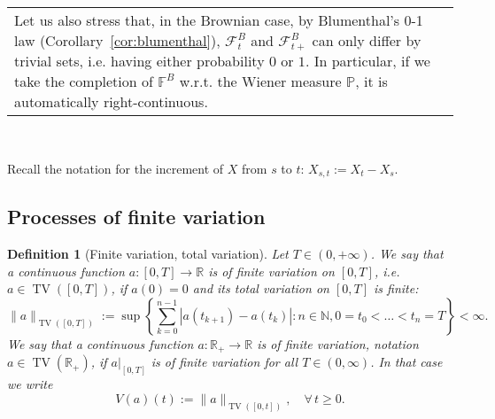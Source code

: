 \documentclass{article}
\newcommand{\coloneq}{:=}
\newcommand{\tmdummy}{$\mbox{}$}
\newcommand{\emph}[1]{{\em #1\/}}
\newtheorem{definition}{Definition}
{\theorembodyfont{\rmfamily}\newtheorem{example}{Example}}
\newcommand{\1}{\1}
\begin{document}
{\begin{tabularx}{1.0\textwidth}{@{}X@{}}
  Let us also stress that, in the Brownian case, by Blumenthal's 0-1 law
  (Corollary~\ref{cor:blumenthal}), $\mathcal{F}^B_t$ and $\mathcal{F}^B_{t
  +}$ can only differ by trivial sets, i.e. having either probability $0$ or
  $1$. In particular, if we take the completion of $\mathbb{F}^B$ w.r.t. the
  Wiener measure $\mathbb{P}$, it is automatically right-continuous. 
\end{tabularx}

\

Recall the notation for the increment of $X$ from $s$ to $t$: $X_{s, t}
\coloneq X_t - X_s$.

\subsection{Processes of finite variation}

\begin{definition}[Finite variation, total variation]
  Let $T \in (0, + \infty)$. We say that a continuous function $a : [0, T]
  \rightarrow \mathbb{R}$ is of {\emph{finite variation}} on $[0, T]$, i.e. $a
  \in \operatorname{TV} ([0, T])$, if $a (0) = 0$ and its {\emph{total variation}} on
  $[0, T]$ is finite:
  \[ \| a \|_{\operatorname{TV} ([0, T])} \coloneq \sup \left\{ \sum_{k = 0}^{n - 1} |a
     (t_{k + 1}) - a (t_k) | : n \in \mathbb{N}, 0 = t_0 < \ldots < t_n = T
     \right\} < \infty . \]
  We say that a continuous function $a : \mathbb{R}_+ \rightarrow \mathbb{R}$
  is of {\emph{finite variation}}, notation $a \in \operatorname{TV} (\mathbb{R}_+)$,
  if $a|_{[0, T]}$ is of finite variation for all $T \in (0, \infty)$. In that
  case we write
  \[ V (a) (t) \coloneq \| a \|_{\operatorname{TV} ([0, t])}, \quad \forall \, t
     \geqslant 0. \]
\end{definition}

\begin{example}
  \label{ex:finite-variation}{\tmdummy}
  

\end{example}}
\end{document}
